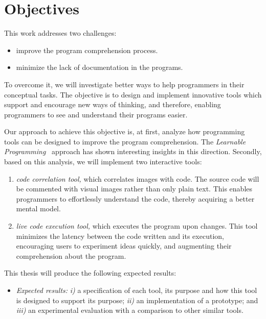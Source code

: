 
% 
% 

\section{Objectives}

This work addresses two challenges:

\begin{itemize}
\item improve the program comprehension process.
\item minimize the lack of documentation in the programs.
\end{itemize}

To overcome it, we will investigate better ways to help programmers in their conceptual tasks. The objective is to design and implement innovative tools which support and encourage new ways of thinking, and therefore, enabling programmers to see and understand their programs easier.

Our approach to achieve this objective is, at first, analyze how programming tools can be designed to improve the program comprehension. The \textit{Learnable Programming}~\cite{learnableProg,inventingPrin} approach has shown interesting insights in this direction. Secondly, based on this analysis, we will implement two interactive tools: 

\begin{enumerate}
\item \textit{code correlation tool,} which correlates images with code. The source code will be commented with visual images rather than only plain text. This enables programmers to effortlessly understand the code, thereby acquiring a better mental model.
\item \textit{live code execution tool,} which executes the program upon changes. This tool minimizes the latency between the code written and its execution, encouraging users to experiment ideas quickly, and augmenting their comprehension about the program.
\end{enumerate}

This thesis will produce the following expected results:
 
\begin{itemize}
\item[] \textit{Expected results:} \textit{i)} a specification of each tool, its purpose and how this tool is designed to support its purpose; \textit{ii)} an implementation of a prototype; and \textit{iii)} an experimental evaluation with a comparison to other similar tools.
\end{itemize}